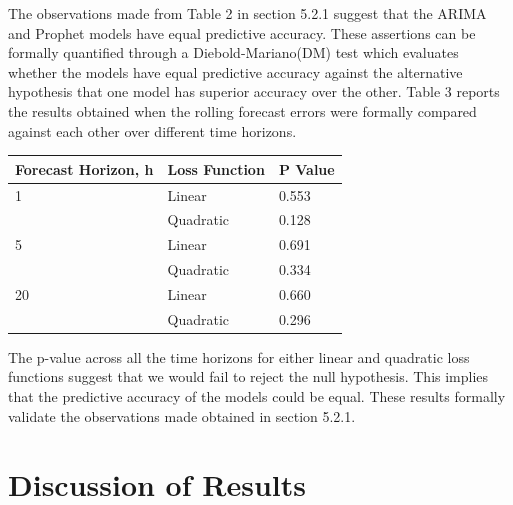 \documentclass[12pt,a4paper]{article}
\numberwithin{equation}{section}
\numberwithin{figure}{section}
\numberwithin{table}{section}
\let\origtable\table
\let\endorigtable\endtable
\renewenvironment{table}[1][2] {
    \expandafter\origtable\expandafter[H]
} {
    \endorigtable
}
\begin{document}
The observations made from Table 2 in section 5.2.1 suggest that the
ARIMA and Prophet models have equal predictive accuracy. These
assertions can be formally quantified through a Diebold-Mariano(DM) test
which evaluates whether the models have equal predictive accuracy
against the alternative hypothesis that one model has superior accuracy
over the other. Table 3 reports the results obtained when the rolling
forecast errors were formally compared against each other over different
time horizons.

\begin{table}[H]
\centering
\begin{tabular}{lll}
  \hline
Forecast Horizon, h & Loss Function & P Value \\ 
  \hline
1 & Linear & 0.553 \\ 
    & Quadratic & 0.128 \\ 
  5 & Linear & 0.691 \\ 
    & Quadratic & 0.334 \\ 
  20 & Linear & 0.660 \\ 
    & Quadratic & 0.296 \\ 
   \hline
\end{tabular}
\caption{Results of the Diebold-Mariano Hypothesis Test for different loss functions} 
\end{table}

The p-value across all the time horizons for either linear and quadratic
loss functions suggest that we would fail to reject the null hypothesis.
This implies that the predictive accuracy of the models could be equal.
These results formally validate the observations made obtained in
section 5.2.1.

\section{Discussion of Results}\label{discussion-of-results}
\end{document}
